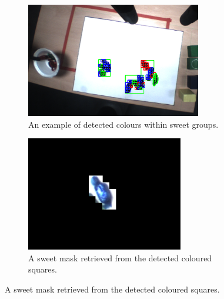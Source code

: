 \begin{figure}[ht!]
    \captionsetup[subfigure]{justification=centering}
    \begin{subfigure}[H]{0.475\textwidth}   
        \centering 
        \includegraphics[width=\textwidth, height=5cm]{boxapproach.png}
        \caption{An example of detected colours within sweet groups.}
        \label{fig:TimeGrasp}
    \end{subfigure}
    \begin{subfigure}[H]{0.475\textwidth}   
        \centering 
        \includegraphics[width=\textwidth, height=5cm]{separatecollisionintoarea.png}
        \caption{A sweet mask retrieved from the detected coloured squares.}
        \label{fig:TimeGrasp}
    \end{subfigure}
\end{figure}
